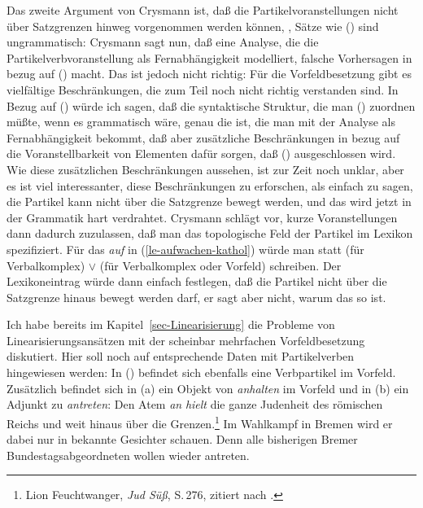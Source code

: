 Das zweite Argument von Crysmann ist, daß die Partikelvoranstellungen
nicht über Satzgrenzen hinweg vorgenommen werden können, \dash, Sätze wie
() sind ungrammatisch:
\z
{}
Crysmann sagt nun, daß eine Analyse, die die Partikelverbvoranstellung als
Fernabhängigkeit modelliert, falsche Vorhersagen in bezug auf () macht.
Das ist jedoch nicht richtig: Für die Vorfeldbesetzung gibt es vielfältige
Beschränkungen, die zum Teil noch nicht richtig verstanden sind. In Bezug auf ()
würde ich sagen, daß die syntaktische Struktur, die man () zuordnen
müßte, wenn es grammatisch wäre, genau die ist, die man mit der Analyse als
Fernabhängigkeit bekommt, daß aber zusätzliche Beschränkungen in bezug auf die Voranstellbarkeit
von Elementen dafür sorgen, daß () ausgeschlossen wird.
Wie diese zusätzlichen Beschränkungen aussehen, ist zur Zeit noch unklar, aber
es ist viel interessanter, diese Beschränkungen zu erforschen, als einfach zu sagen,
die Partikel kann nicht über die Satzgrenze bewegt werden, und das wird jetzt in
der Grammatik hart verdrahtet. Crysmann schlägt vor, kurze Voranstellungen
dann dadurch zuzulassen, daß man das topologische Feld der Partikel im Lexikon
spezifiziert. Für das \emph{auf} in (\ref{le-aufwachen-kathol})
würde man statt  (für Verbalkomplex)
 $\vee$  (für Verbalkomplex oder Vorfeld) schreiben.
Der Lexikoneintrag würde dann einfach festlegen, daß die Partikel nicht über die Satzgrenze 
hinaus bewegt werden darf, er sagt aber nicht, warum das so ist.

Ich habe bereits im Kapitel~\ref{sec-Linearisierung} die Probleme von Linearisierungsansätzen
mit der scheinbar mehrfachen Vorfeldbesetzung diskutiert. Hier soll noch auf entsprechende
Daten mit Partikelverben hingewiesen werden: In () befindet sich ebenfalls
eine Verbpartikel im Vorfeld. Zusätzlich befindet sich \zb in (a)
ein Objekt von \emph{anhalten} im Vorfeld und in (b) ein Adjunkt zu \emph{antreten}:
\eal
\ex\label{bsp-den-atem-an-haelt}
Den Atem \emph{an} \emph{hielt} die ganze Judenheit des römischen Reichs und weit hinaus über die Grenzen.\footnote{
        Lion Feuchtwanger, \emph{Jud Süß}, S.\,276, zitiert nach .
}
\ex\label{bsp-wieder-an-tritt}
Im Wahlkampf in Bremen wird er dabei nur in bekannte Gesichter schauen. Denn alle bisherigen Bremer Bundestagsabgeordneten wollen wieder antreten.

